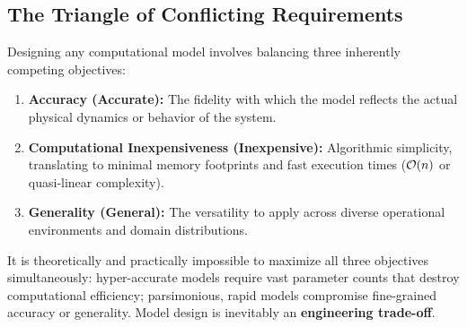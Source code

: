 \subsection{The Triangle of Conflicting Requirements}
Designing any computational model involves balancing three inherently competing objectives:
\begin{enumerate}
    \item \textbf{Accuracy (Accurate):} The fidelity with which the model reflects the actual physical dynamics or behavior of the system.
    \item \textbf{Computational Inexpensiveness (Inexpensive):} Algorithmic simplicity, translating to minimal memory footprints and fast execution times ($\mathcal{O}\!\left(n\right)$ or quasi-linear complexity).
    \item \textbf{Generality (General):} The versatility to apply across diverse operational environments and domain distributions.
\end{enumerate}

\begin{property}
It is theoretically and practically impossible to maximize all three objectives simultaneously: hyper-accurate models require vast parameter counts that destroy computational efficiency; parsimonious, rapid models compromise fine-grained accuracy or generality. Model design is inevitably an \textbf{engineering trade-off}.
\end{property}


